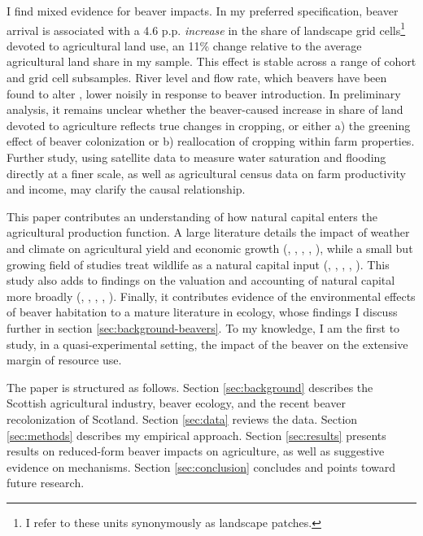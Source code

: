 I find mixed evidence for beaver impacts. In my preferred specification, beaver arrival is associated with a 4.6 p.p. \textit{increase} in the share of landscape grid cells\footnote{I refer to these units synonymously as landscape patches.} devoted to agricultural land use, an 11\% change relative to the average agricultural land share in my sample. This effect is stable across a range of cohort and grid cell subsamples. River level and flow rate, which beavers have been found to alter \citep{swinnen_environmental_2019}, lower noisily in response to beaver introduction. In preliminary analysis, it remains unclear whether the beaver-caused increase in share of land devoted to agriculture reflects true changes in cropping, or either a) the greening effect of beaver colonization or b) reallocation of cropping within farm properties. Further study, using satellite data to measure water saturation and flooding directly at a finer scale, as well as agricultural census data on farm productivity and income, may clarify the causal relationship.

This paper contributes an understanding of how natural capital enters the agricultural production function. A large literature details the impact of weather and climate on agricultural yield and economic growth (\cite{mendelsohn_impact_1994}, \cite{schlenker_impact_2006}, \cite{schlenker_nonlinear_2009}, \cite{hsiang_causal_2014}, \cite{taylor_environmental_2021}), while a small but growing field of studies treat wildlife as a natural capital input (\cite{frank_economic_2024}, \cite{rucker_colony_2019}, \cite{champetier_bioeconomics_2015}, \cite{kawasaki_impact_2023}, \cite{devkota_assessing_2024}). This study also adds to findings on the valuation and accounting of natural capital more broadly (\cite{lewis_nature_2024}, \cite{raynor_wolves_2021}, \cite{fenichel_measuring_2016}, \cite{fenichel_natural_2014}, \cite{kareiva_natural_2011}). Finally, it contributes evidence of the environmental effects of beaver habitation to a mature literature in ecology, whose findings I discuss further in section \ref{sec:background-beavers}. To my knowledge, I am the first to study, in a quasi-experimental setting, the impact of the beaver on the extensive margin of resource use.

The paper is structured as follows. Section \ref{sec:background} describes the Scottish agricultural industry, beaver ecology, and the recent beaver recolonization of Scotland. Section \ref{sec:data} reviews the data. Section \ref{sec:methods} describes my empirical approach. Section \ref{sec:results} presents results on reduced-form beaver impacts on agriculture, as well as suggestive evidence on mechanisms. Section \ref{sec:conclusion} concludes and points toward future research.